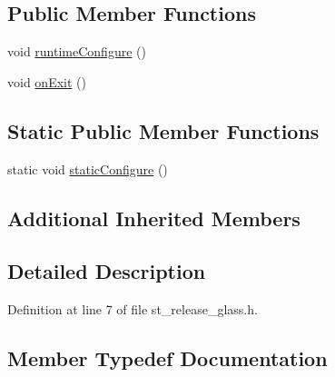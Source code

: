 \subsection*{Public Member Functions}
\begin{DoxyCompactItemize}
\item 
void \hyperlink{structsm__fetch__two__table__whiskey__pour_1_1StReleaseGlass_a30b9b41f900fb5204e3f7524cc8853c1}{runtime\+Configure} ()
\item 
void \hyperlink{structsm__fetch__two__table__whiskey__pour_1_1StReleaseGlass_af682ad9a096cf3095ad3c167e5145b8a}{on\+Exit} ()
\end{DoxyCompactItemize}
\subsection*{Static Public Member Functions}
\begin{DoxyCompactItemize}
\item 
static void \hyperlink{structsm__fetch__two__table__whiskey__pour_1_1StReleaseGlass_a04caf074bf4d8fd2e93e597617219de9}{static\+Configure} ()
\end{DoxyCompactItemize}
\subsection*{Additional Inherited Members}


\subsection{Detailed Description}


Definition at line 7 of file st\+\_\+release\+\_\+glass.\+h.



\subsection{Member Typedef Documentation}
\mbox{\label{structsm__fetch__two__table__whiskey__pour_1_1StReleaseGlass_ae475d9da3dcce67aa1951a1928ec91e6}} 
